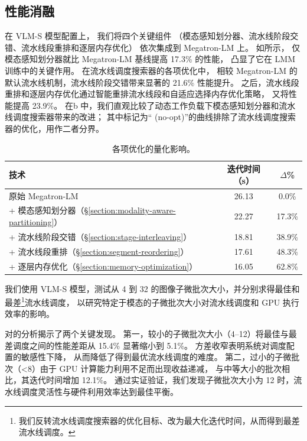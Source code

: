\subsection{性能消融}

在 VLM-S 模型配置上，
我们将四个关键组件
（模态感知划分器、流水线阶段交错、流水线段重排和逐层内存优化）
依次集成到 Megatron-LM 上。
如所示，
仅模态感知划分器就比 Megatron-LM 基线提高 17.3\% 的性能，
凸显了它在 LMM 训练中的关键作用。
在流水线调度搜索器的各项优化中，
相较 Megatron-LM 的默认流水线机制，流水线阶段交错带来显著的 21.6\% 性能提升。
之后，流水线段重排和逐层内存优化通过智能重排流水线段和自适应选择内存优化策略，
又将性能提高 23.9\%。
在b 中，我们直观比较了动态工作负载下模态感知划分器和流水线调度搜索器带来的改进；
其中标记为“\sys{} (no-opt)”的曲线排除了流水线调度搜索器的优化，用作二者分界。

\begin{table}[t]
    \caption{
        \sys{} 各项优化的量化影响。
    }
    \label{table:performance-breakdown}

    \small
    \begin{tabular}{>{\raggedright}p{4.5cm}cc}
    \toprule
    \textbf{技术} & \textbf{迭代时间（s）} & \textbf{$\Delta$\%} \\
    \midrule
    原始 Megatron-LM & 26.13 & 0.0\% \\
    \midrule
    + 模态感知划分器（\S\ref{section:modality-aware-partitioning}） & 22.27 & 17.3\% \\
    + 流水线阶段交错（\S\ref{section:stage-interleaving}） & 18.81 & 38.9\% \\
    + 流水线段重排（\S\ref{section:segment-reordering}） & 17.61 & 48.3\% \\
    + 逐层内存优化（\S\ref{section:memory-optimization}） & 16.05 & 62.8\% \\
    \bottomrule
    \end{tabular}
\end{table}

我们使用 VLM-S 模型，测试从 4 到 32 的图像子微批次大小，并分别求得最佳和最差\footnote{我们反转流水线调度搜索器的优化目标、改为最大化迭代时间，从而得到最差流水线调度。}流水线调度，
以研究特定于模态的子微批次大小对流水线调度和 GPU 执行效率的影响。

对的分析揭示了两个关键发现。
第一，较小的子微批次大小（4--12）将最佳与最差调度之间的性能差距从 15.4\% 显著缩小到 5.1\%。
方差收窄表明系统对调度配置的敏感性下降，
从而降低了得到最优流水线调度的难度。
第二，过小的子微批次（<8）由于 GPU 计算能力利用不足而出现收益递减，
与中等大小的批次相比，其迭代时间增加 12.1\%。
通过实证验证，我们发现子微批次大小为 12 时，流水线调度灵活性与硬件利用效率达到最佳平衡。

